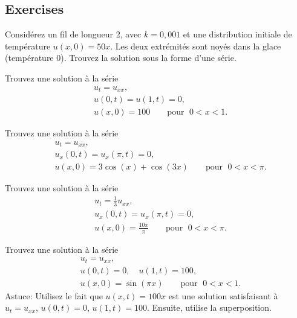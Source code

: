 \subsection{Exercises}

\begin{exercise}
Considérez un fil de longueur 2,  avec $ k = 0,001 $ et une 
distribution initiale de température $ u (x, 0) = 50 x $.  Les deux extrémités
sont noyés dans la glace (température 0).  Trouvez la solution sous la forme d'une série.
\end{exercise}

\begin{exercise}
Trouvez une solution à la série 
\begin{align*}
& u_t =  u_{xx} , \\
& u(0,t) = u(1,t) = 0 , \\
& u(x,0) = 100 \qquad \text{pour } \; 0 < x < 1 .
\end{align*}
\end{exercise}

\begin{exercise}
Trouvez une solution à la série 
\begin{align*}
& u_t =  u_{xx} , \\
& u_x(0,t) = u_x(\pi,t) = 0 , \\
& u(x,0) = 3\cos (x) + \cos (3x) \qquad \text{pour } \; 0 < x < \pi .
\end{align*}
\end{exercise}

\begin{exercise} \label{heat:cosexr}
Trouvez une solution à la série 
\begin{align*}
& u_t = \frac{1}{3} u_{xx} , \\
& u_x(0,t) = u_x(\pi,t) = 0 , \\
& u(x,0) = \frac{10x}{\pi} \qquad \text{pour } \; 0 < x < \pi .
\end{align*}
\end{exercise}

\begin{exercise} \label{heat:oneto100exr}
Trouvez une solution à la série 
\begin{align*}
& u_t =  u_{xx} , \\
& u(0,t) = 0 , \quad u(1,t) = 100 , \\
& u(x,0) = \sin (\pi x) \qquad \text{pour } \; 0 < x < 1 .
\end{align*}
Astuce: Utilisez le fait que $u(x,t) = 100 x$ est une solution satisfaisant à 
$u_t = u_{xx}$, $u(0,t) = 0$, $u(1,t) = 100$.  Ensuite, utilise la superposition.
\end{exercise}


